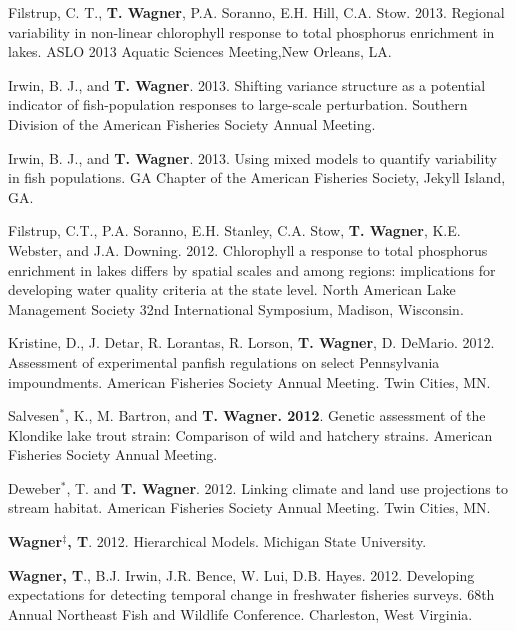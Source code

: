 \documentclass[10pt]{article}
\begin{document}
\begin{flushleft}
\begin{etaremune}
\item Filstrup, C. T., {\bf T. Wagner}, P.A. Soranno, E.H. Hill, C.A. Stow. 2013. Regional variability in non-linear chlorophyll response to total phosphorus enrichment in lakes. ASLO 2013 Aquatic Sciences Meeting,New Orleans, LA.

\item Irwin, B. J., and {\bf T. Wagner}. 2013. Shifting variance structure as a potential indicator of fish-population responses to large-scale perturbation. Southern Division of the American Fisheries Society Annual Meeting.

\item Irwin, B. J., and {\bf T. Wagner}. 2013. Using mixed models to quantify variability in fish populations. GA Chapter of the American Fisheries Society, Jekyll Island, GA.


\item Filstrup, C.T., P.A. Soranno, E.H. Stanley, C.A. Stow, {\bf T. Wagner}, K.E. Webster, and J.A. Downing. 2012. Chlorophyll a response to total phosphorus enrichment in lakes differs by spatial scales and among regions: implications for developing water quality criteria at the state level. North American Lake Management Society 32nd International Symposium, Madison, Wisconsin. 

\item Kristine, D., J. Detar, R. Lorantas, R. Lorson,  {\bf T. Wagner}, D. DeMario. 2012. Assessment of experimental panfish regulations on select Pennsylvania impoundments. American Fisheries Society Annual Meeting. Twin Cities, MN.

\item Salvesen$^*$, K., M. Bartron, and {\bf T. Wagner. 2012}. Genetic assessment of the Klondike lake trout strain: Comparison of wild and hatchery strains. American Fisheries Society Annual Meeting. 

\item Deweber$^*$, T. and  {\bf T. Wagner}. 2012. Linking climate and land use projections to stream habitat. American Fisheries Society Annual Meeting. Twin Cities, MN. 

\item {\bf Wagner$^\ddagger$, T}. 2012. Hierarchical Models. Michigan State University.

 \item {\bf Wagner, T}., B.J. Irwin, J.R. Bence, W. Lui, D.B. Hayes. 2012. Developing expectations for detecting temporal change in freshwater fisheries surveys. 68th Annual Northeast Fish and Wildlife Conference. Charleston, West Virginia. 


\end{etaremune}
\end{flushleft}
\end{document}
